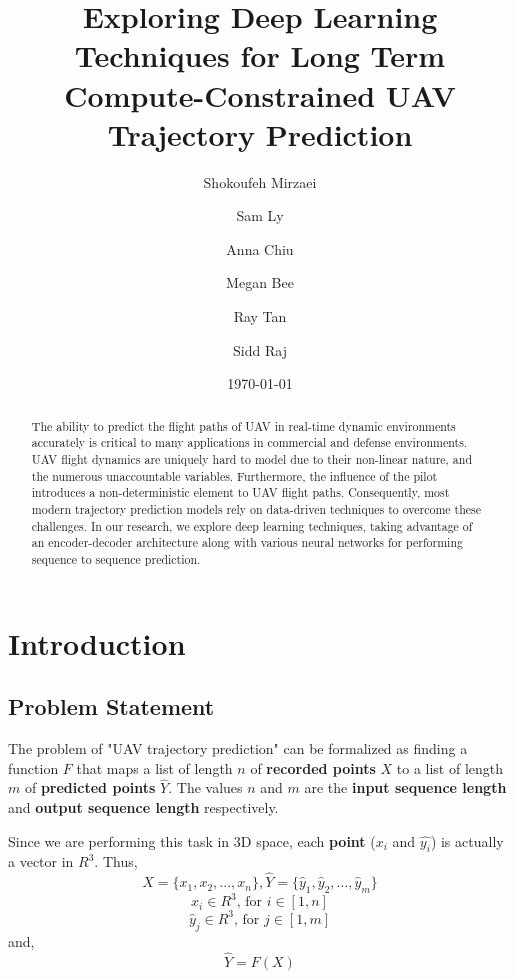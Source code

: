 \documentclass{article}
\begin{document}
\title{
    Exploring Deep Learning Techniques for Long Term Compute-Constrained UAV Trajectory Prediction
}

\author{
    Shokoufeh Mirzaei
    \and Sam Ly
    \and Anna Chiu
    \and Megan Bee
    \and Ray Tan
    \and Sidd Raj
}

\date{\today}

\maketitle

\begin{abstract}
    The ability to predict the flight paths of UAV in real-time dynamic 
    environments accurately is critical to many applications in commercial and 
    defense environments. UAV flight dynamics are uniquely hard to model due to 
    their non-linear nature, and the numerous unaccountable variables. 
    Furthermore, the influence of the pilot introduces a non-deterministic 
    element to UAV flight paths. Consequently, most  modern trajectory 
    prediction models rely on data-driven techniques to overcome these 
    challenges. In our research, we explore deep learning techniques, taking 
    advantage of an encoder-decoder architecture along with various neural 
    networks for performing sequence to sequence prediction. 
\end{abstract}


\section{Introduction}
\subsection{Problem Statement}
The problem of "UAV trajectory prediction" can be formalized as finding a function $F$ 
that maps a list of length $n$ of \textbf{recorded points} $X$ to a list of 
length $m$ of \textbf{predicted points} $\hat{Y}$. The values $n$ and $m$ are the 
\textbf{input sequence length} and \textbf{output sequence length} respectively.

Since we are performing this task in 3D space, each \textbf{point} ($x_i$ and 
$\hat{y_i}$) is actually a vector in $R^3$. Thus,
$$ X = \{x_1, x_2, ..., x_n\}, \hat{Y} = \{\hat{y}_1, \hat{y}_2, ..., \hat{y}_m\} $$ 
$$ x_i \in R^3 \text{, for } i \in [1, n]$$
$$\hat{y}_j \in R^3 \text{, for } j \in [1, m]$$
and,
$$ \hat{Y} = F(X) $$
\end{document}
